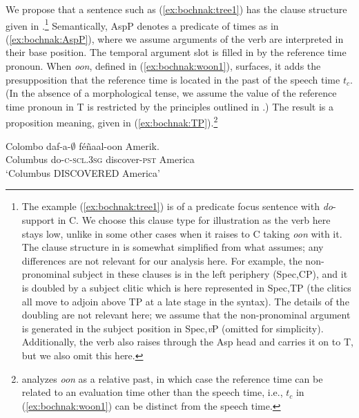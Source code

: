 \documentclass[output=paper,newtxmath,modfonts,nonflat,draftmode]{langsci/langscibook}
\begin{document}
We propose that a sentence such as (\ref{ex:bochnak:tree1}) has the clause
structure given in .\footnote{The example
  (\ref{ex:bochnak:tree1}) is of a predicate focus sentence with
  \textit{do}-support in C. We choose this clause type for
  illustration as the verb here stays low, unlike in some other cases
  when it raises to C taking \textit{oon} with it. The clause structure
 in  is somewhat simplified from what \cite{Martinovic2015b} assumes; any
differences are not relevant for our analysis here. For example, the
non-pronominal subject in these clauses is in the left periphery
(Spec,CP), and it is doubled by a subject clitic which is here
represented in Spec,TP (the clitics all move to adjoin above TP at a
late stage in the syntax). The details of the doubling are not
relevant here; we assume that the non-pronominal argument is generated
in the subject position in Spec,\textit{v}P (omitted for simplicity). Additionally, the verb also
raises through the Asp head and carries it on to T, but we also omit this
here.} Semantically, AspP denotes a predicate of times as in (\ref{ex:bochnak:AspP}), where we assume arguments of the verb are interpreted in their base position. The temporal argument slot is filled in by the reference time pronoun. When  \textit{oon}, defined in (\ref{ex:bochnak:woon1}), surfaces, it adds the presupposition that the reference time is located in the past of the speech time $t_c$. (In the absence of a morphological tense, we assume the value of the reference time pronoun in T is restricted by the principles outlined in .) The result is a proposition meaning, given in (\ref{ex:bochnak:TP}).\footnote{\citet{robert91approche} analyzes \textit{oon} as a relative past, in which case the reference time can be related to an evaluation time other than the speech time, i.e., $t_c$ in (\ref{ex:bochnak:woon1}) can be distinct from the speech time.}

\ea\label{ex:bochnak:tree1} \gll Colombo daf-a-$\emptyset$ f\'e\~naal-oon Amerik.\\
Columbus do\textsc{-c-scl.3sg} discover-\textsc{pst} America\\
\glt`Columbus DISCOVERED America'
\z
\end{document}
